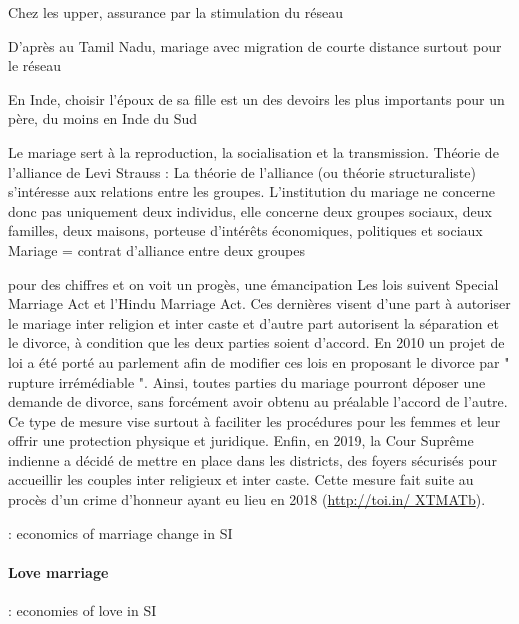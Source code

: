 \documentclass[a4paper, 11pt, onecolumn]{article}
\begin{document}
Chez les upper, assurance par la stimulation du réseau \cite{Munshi2009}

D'après \cite{Jejeebhoy2005} au Tamil Nadu, mariage avec migration de courte distance surtout pour le réseau

En Inde, choisir l’époux de sa fille est un des devoirs les plus importants pour un père, du
moins en Inde du Sud \cite{Jejeebhoy2005}

Le mariage sert à la reproduction, la socialisation et la transmission.
Théorie de l'alliance de Levi Strauss : La théorie de l’alliance (ou théorie structuraliste) s’intéresse aux relations entre les groupes. L’institution du mariage ne concerne donc pas uniquement deux individus, elle concerne deux groupes sociaux, deux familles, deux maisons, porteuse d’intérêts économiques, politiques et sociaux \cite{Héritier2015} 
Mariage = contrat d'alliance entre deux groupes

\citep{Rubio2014} pour des chiffres et on voit un progès, une émancipation \citep{Jejeebhoy2005}
Les lois suivent
Special Marriage Act et
l’Hindu Marriage Act. Ces dernières visent d’une part à autoriser le mariage inter religion et
inter caste et d’autre part autorisent la séparation et le divorce, à condition que les deux parties
soient d’accord. En 2010 un projet de loi a été porté au parlement afin de modifier ces lois en
proposant le divorce par " rupture irrémédiable ". Ainsi, toutes parties du mariage pourront
déposer une demande de divorce, sans forcément avoir obtenu au préalable l’accord de l’autre.
Ce type de mesure vise surtout à faciliter les procédures pour les femmes et leur offrir une
protection physique et juridique. Enfin, en 2019, la Cour Suprême indienne a décidé de mettre
en place dans les districts, des foyers sécurisés pour accueillir les couples inter religieux et inter
caste. Cette mesure fait suite au procès d’un crime d’honneur ayant eu lieu en 2018 (\url{http://toi.in/
XTMATb}).

\cite{Dharmalingam1994} : economics of marriage change in SI


\paragraph{Love marriage}
\cite{DeNeve2016} : economies of love in SI
\end{document}

